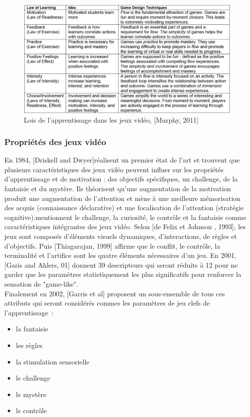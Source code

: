 \begin{figure}[h!]
	\includegraphics[width=1.1\linewidth]{images/laws_of_learning_for_games.png}
	\caption{Lois de l'apprentissage dans les jeux vidéo, [Murphy, 2011]\cite{Murp11}}
	\label{laws_of_learning_for_games}
\end{figure}

			\subsubsection*{Propriétés des jeux vidéo}
En 1984, [Driskell and Dwyer]\cite{Dris84}réalisent un premier état de l'art et trouvent que plusieurs caractéristiques des jeux vidéo peuvent influer sur les propriétés d'apprentissage et de motivation : des objectifs spécifiques, un challenge, de la fantaisie et du mystère. Ils théorisent qu'une augmentation de la motivation produit une augmentation de l'attention et mène à une meilleure mémorisation des acquis (connaissance déclarative) et une focalisation de l'attention (stratégie cognitive). mentionnent le challenge, la curiosité, le contrôle et la fantaisie comme caractéristiques intégrantes des jeux vidéo. Selon [de Felix et Johnson , 1993], les jeux sont composés d'éléments visuels dynamiques, d'interactions, de règles et d'objectifs. Puis [Thiagarajan, 1999] affirme que le conflit, le contrôle, la terminalité et l'artifice sont les quatre éléments nécessaires d'un jeu. En 2001, [Garis and Ahlers, 01] donnent 39 descripteurs qui seront réduits à 12 pour ne garder que les paramètres statistiquement les plus significatifs pour renforcer la sensation de "game-like". \\ Finalement en 2002, [Garris et al] proposent un sous-ensemble de tous ces attributs qui seront considérés commes les paramètres de jeu clefs de l'apprentissage~:
\begin{itemize}
	\item la fantaisie
	\item les règles
	\item la stimulation sensorielle
	\item le challenge
	\item le mystère
	\item le contrôle
\end{itemize}

